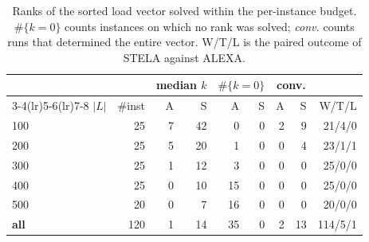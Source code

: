 \begin{table}[t]\centering
\caption{Ranks of the sorted load vector solved within the per-instance budget. $\#\{k=0\}$ counts instances on which no rank was solved; \emph{conv.} counts runs that determined the entire vector. W/T/L is the paired outcome of STELA against ALEXA.}
\label{tab:depth}\small
\begin{tabular}{@{}lrrrrrrrr@{}}
\toprule
& & \multicolumn{2}{c}{median $k$} & \multicolumn{2}{c}{$\#\{k=0\}$} & \multicolumn{2}{c}{conv.} & \\
\cmidrule(lr){3-4}\cmidrule(lr){5-6}\cmidrule(lr){7-8}
$|L|$ & \#inst & A & S & A & S & A & S & W/T/L \\
\midrule
100 & 25 & 7 & 42 & 0 & 0 & 2 & 9 & 21/4/0 \\
200 & 25 & 5 & 20 & 1 & 0 & 0 & 4 & 23/1/1 \\
300 & 25 & 1 & 12 & 3 & 0 & 0 & 0 & 25/0/0 \\
400 & 25 & 0 & 10 & 15 & 0 & 0 & 0 & 25/0/0 \\
500 & 20 & 0 & 7 & 16 & 0 & 0 & 0 & 20/0/0 \\
\midrule
\textbf{all} & 120 & 1 & 14 & 35 & 0 & 2 & 13 & 114/5/1 \\
\bottomrule
\end{tabular}
\end{table}
